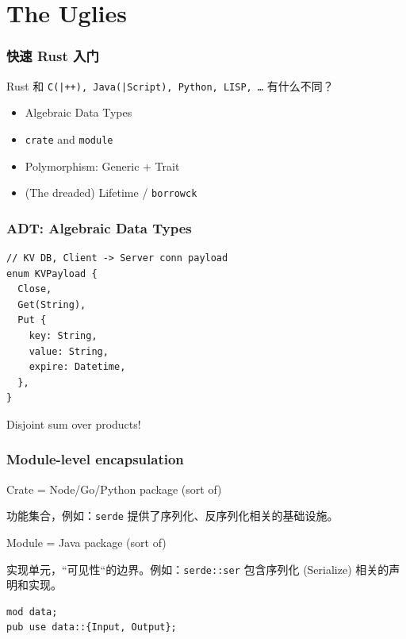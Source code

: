 \documentclass[UTF-8]{ctexbeamer}
\begin{document}
\section{The Uglies}

\begin{frame}
  \frametitle{快速 Rust 入门}

  Rust 和 \texttt{C(|++), Java(|Script), Python, LISP, \dots} 有什么不同？

  \pause
  \vspace{1em}

  \begin{itemize}
    \item Algebraic Data Types
    \item \texttt{crate} and \texttt{module}
    \item Polymorphism: Generic + Trait
    \item (The dreaded) Lifetime / \texttt{borrowck}
  \end{itemize}
\end{frame}

\begin{frame}[fragile]
  \frametitle{ADT: Algebraic Data Types}

  \begin{verbatim}
// KV DB, Client -> Server conn payload
enum KVPayload {
  Close,
  Get(String),
  Put {
    key: String,
    value: String,
    expire: Datetime,
  },
}
  \end{verbatim}

  \pause
  \vspace{1em}
  Disjoint sum over products!
\end{frame}

\begin{frame}[fragile]
  \frametitle{Module-level encapsulation}

  Crate = Node/Go/Python package (sort of)

  功能集合，例如：\texttt{serde} 提供了序列化、反序列化相关的基础设施。

  \pause
  \vspace{1em}

  Module = Java package (sort of)

  实现单元，“可见性“的边界。例如：\texttt{serde::ser} 包含序列化 (Serialize) 相关的声明和实现。

  \pause
  \vspace{1em}

  \begin{verbatim}
mod data;
pub use data::{Input, Output};
  \end{verbatim}
\end{frame}
\end{document}

